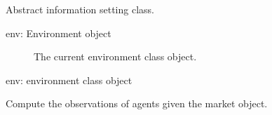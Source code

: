 \documentclass[letterpaper,10pt,english]{sphinxmanual}
\begin{document}

\begin{fulllineitems}
\label{\detokenize{MultiAgentMarketRL:info_setting.InformationSetting}}
\sphinxAtStartPar
Abstract information setting class.
\begin{description}
\item[{env: Environment object}] \leavevmode
\sphinxAtStartPar
The current environment class object.

\end{description}

\begin{fulllineitems}
\label{\detokenize{MultiAgentMarketRL:info_setting.InformationSetting.__init__}}
\sphinxAtStartPar
env: environment class object

\end{fulllineitems}


\begin{fulllineitems}
\label{\detokenize{MultiAgentMarketRL:info_setting.InformationSetting.get_states}}
\sphinxAtStartPar
Compute the observations of agents given the market object.

\end{fulllineitems}


\end{fulllineitems}

\end{document}
